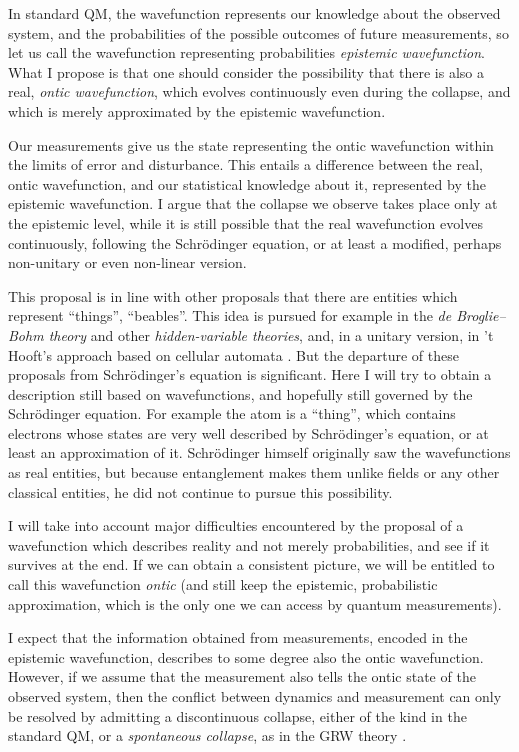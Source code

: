 \documentclass[12pt]{amsart}
\theoremstyle{definition}
\theoremstyle{plain}
\begin{document}
In standard QM, the wavefunction represents our knowledge about the observed system, and the probabilities of the possible outcomes of future measurements, so let us call the wavefunction representing probabilities \emph{epistemic wavefunction}. What I propose is that one should consider the possibility that there is also a real, \emph{ontic wavefunction}, which evolves continuously even during the collapse, and which is merely approximated by the epistemic wavefunction. 

Our measurements give us the state representing the ontic wavefunction within the limits of error and disturbance. This entails a difference between the real, ontic wavefunction, and our statistical knowledge about it, represented by the epistemic wavefunction. I argue that the collapse we observe takes place only at the epistemic level, while it is still possible that the real wavefunction evolves continuously, following the Schr\"odinger equation, or at least a modified, perhaps non-unitary or even non-linear version.

This proposal is in line with other proposals that there are entities which represent ``things'', ``beables''. This idea is pursued for example in the \emph{de Broglie--Bohm theory} \cite{deBroglie1926OndesEtMouvements,Bohm52,DGZ1996BohmianMechanics,DGZ2012QPhysWithoutQPhil} and other \emph{hidden-variable theories}, and, in a unitary version, in 't Hooft's approach based on cellular automata \cite{tHooft2014CellularAutomatonInterpretationQM}. But the departure of these proposals from Schr\"odinger's equation is significant.
Here I will try to obtain a description still based on wavefunctions, and hopefully still governed by the Schr\"odinger equation. For example the atom is a ``thing'', which contains electrons whose states are very well described by Schr\"odinger's equation, or at least an approximation of it. Schr\"odinger himself originally saw the wavefunctions as real entities, but because entanglement makes them unlike fields or any other classical entities, he did not continue to pursue this possibility.

I will take into account major difficulties encountered by the proposal of a wavefunction which describes reality and not merely probabilities, and see if it survives at the end. If we can obtain a consistent picture, we will be entitled to call this wavefunction \emph{ontic} (and still keep the epistemic, probabilistic approximation, which is the only one we can access by quantum measurements).

I expect that the information obtained from measurements, encoded in the epistemic wavefunction, describes to some degree also the ontic wavefunction. However, if we assume that the measurement also tells the ontic state of the observed system, then the conflict between dynamics and measurement can only be resolved by admitting a discontinuous collapse, either of the kind in the standard QM, or a \emph{spontaneous collapse}, as in the GRW theory \cite{GRW86,Diosi1989UniversalReduction}.
\end{document}
